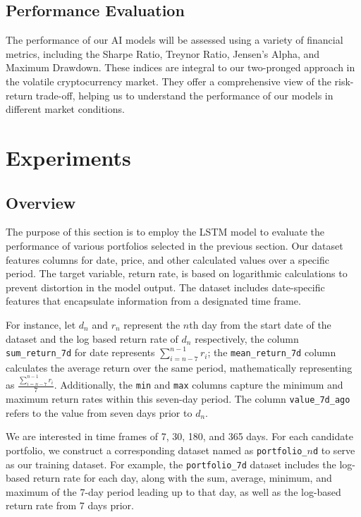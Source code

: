 \documentclass[journal, onecolumn]{IEEEtran}
\begin{document}
\subsection{Performance Evaluation}
The performance of our AI models will be assessed using a variety of financial metrics, including the Sharpe Ratio, Treynor Ratio, Jensen's Alpha, and Maximum Drawdown. These indices are integral to our two-pronged approach in the volatile cryptocurrency market. They offer a comprehensive view of the risk-return trade-off, helping us to understand the performance of our models in different market conditions.

\section{Experiments}
\subsection{Overview}
The purpose of this section is to employ the LSTM model to evaluate the performance of various portfolios selected in the previous section. Our dataset features columns for date, price, and other calculated values over a specific period. The target variable, return rate, is based on logarithmic calculations to prevent distortion in the model output. The dataset includes date-specific features that encapsulate information from a designated time frame. 

For instance, let $d_{n}$ and $r_{n}$ represent the $n$th day from the start date of the dataset and the log based return rate of $d_{n}$ respectively, the column \texttt{sum\_return\_7d} for date  represents $\sum_{i=n-7}^{n-1} r_{i} $; the \texttt{mean\_return\_7d} column calculates the average return over the same period, mathematically representing as $\frac{\sum_{i=n-7}^{n-1} r_{i} }{7}$. Additionally, the \texttt{min} and \texttt{max} columns capture the minimum and maximum return rates within this seven-day period. The column \texttt{value\_7d\_ago} refers to the value from seven days prior to $d_{n}$.

We are interested in time frames of 7, 30, 180, and 365 days. For each candidate portfolio, we construct a corresponding dataset named as \texttt{portfolio\_$n$d} to serve as our training dataset. For example, the \texttt{portfolio\_7d} dataset includes the log-based return rate for each day, along with the sum, average, minimum, and maximum of the 7-day period leading up to that day, as well as the log-based return rate from 7 days prior.
\end{document}
